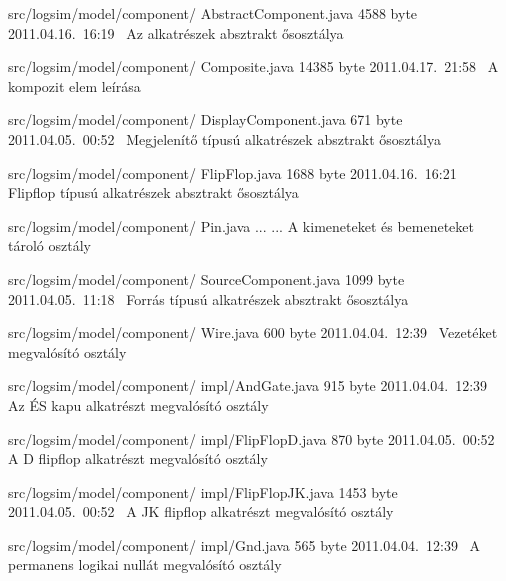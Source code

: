 \begin{fajllista}
\fajl
{src/logsim/model/component/\newline
AbstractComponent.java} %
{4588 byte} %
{2011.04.16.~16:19~} %
{Az alkatrészek absztrakt ősosztálya} %

\fajl
{src/logsim/model/component/\newline
Composite.java} %
{14385 byte} %
{2011.04.17.~21:58~} %
{A kompozit elem leírása} %

\fajl
{src/logsim/model/component/\newline
DisplayComponent.java} %
{671 byte} %
{2011.04.05.~00:52~} %
{Megjelenítő típusú alkatrészek absztrakt ősosztálya} %

\fajl
{src/logsim/model/component/\newline
FlipFlop.java} %
{1688 byte} %
{2011.04.16.~16:21~} %
{Flipflop típusú alkatrészek absztrakt ősosztálya} %

\fajl
{src/logsim/model/component/\newline
Pin.java}
{...}
{...}
{A kimeneteket és bemeneteket tároló osztály}

\fajl
{src/logsim/model/component/\newline
SourceComponent.java} %
{1099 byte} %
{2011.04.05.~11:18~} %
{Forrás típusú alkatrészek absztrakt ősosztálya} %

\fajl
{src/logsim/model/component/\newline
Wire.java} %
{600 byte} %
{2011.04.04.~12:39~} %
{Vezetéket megvalósító osztály} %

\fajl
{src/logsim/model/component/\newline
impl/AndGate.java} %
{915 byte} %
{2011.04.04.~12:39~} %
{Az ÉS kapu alkatrészt megvalósító osztály} %

\fajl
{src/logsim/model/component/\newline
impl/FlipFlopD.java} %
{870 byte} %
{2011.04.05.~00:52~} %
{A D flipflop alkatrészt megvalósító osztály} %

\fajl
{src/logsim/model/component/\newline
impl/FlipFlopJK.java} %
{1453 byte} %
{2011.04.05.~00:52~} %
{A JK flipflop alkatrészt megvalósító osztály} %

\fajl
{src/logsim/model/component/\newline
impl/Gnd.java} %
{565 byte} %
{2011.04.04.~12:39~} %
{A permanens logikai nullát megvalósító osztály} %


\end{fajllista}
